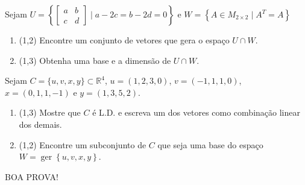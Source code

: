 \documentclass[12pt,a4paper]{article}
\newcommand{\fixme}{{\color{red}(...)}}
\newcommand*\ger[1]{\operatorname{ger}\left\{#1\right\}}
\newcommand*\R{\mathbb{R}}
\begin{document}
\begin{ExerciseList}
\Exercise[title={2,5}] Sejam $U = \left\{ \begin{bmatrix}
a & b\\
c & d
\end{bmatrix} \mid a - 2c = b - 2d = 0 \right\}$ e $W = \left\{ A \in M_{2 \times 2} \mid A^T = A \right\}$
\begin{enumerate}
\item (1,2) Encontre um conjunto de vetores que gera o espaço $U \cap W$.
\item (1,3) Obtenha uma base e a dimensão de $U \cap W$.
\end{enumerate}
\Answer  \fixme

\Exercise[title={2,5}] Sejam $C = \{ u, v, x, y \} \subset \R^4$, $u = (1, 2, 3, 0)$, $v = (-1, 1, 1, 0)$, $x = (0, 1, 1, -1)$ e $y = (1, 3, 5, 2)$.
\begin{enumerate}
\item (1,3) Mostre que $C$ é L.D. e escreva um dos vetores como combinação linear dos demais.
\item (1,2) Encontre um subconjunto de $C$ que seja uma base do espaço $W = \ger{u,v,x,y}$.
\end{enumerate}
\Answer  \fixme

\end{ExerciseList}

\begin{center}
BOA PROVA!
\end{center}

\end{document}
